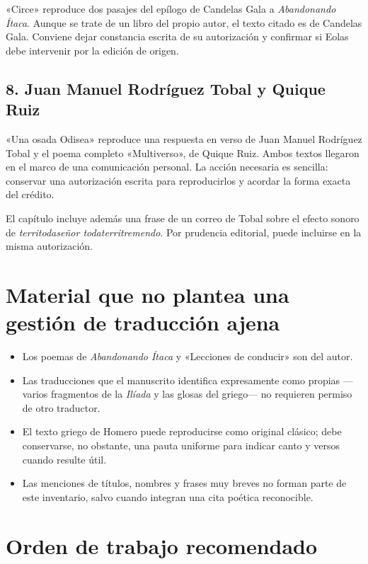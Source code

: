 \documentclass[12pt,a4paper]{article}
\begin{document}
«Circe» reproduce dos pasajes del epílogo de Candelas Gala a \emph{Abandonando Ítaca}. Aunque se trate de un libro del propio autor, el texto citado es de Candelas Gala. Conviene dejar constancia escrita de su autorización y confirmar si Eolas debe intervenir por la edición de origen.

\subsection*{8. Juan Manuel Rodríguez Tobal y Quique Ruiz}

«Una osada Odisea» reproduce una respuesta en verso de Juan Manuel Rodríguez Tobal y el poema completo «Multiverso», de Quique Ruiz. Ambos textos llegaron en el marco de una comunicación personal. La acción necesaria es sencilla: conservar una autorización escrita para reproducirlos y acordar la forma exacta del crédito.

El capítulo incluye además una frase de un correo de Tobal sobre el efecto sonoro de \emph{territodaseñor todaterritremendo}. Por prudencia editorial, puede incluirse en la misma autorización.

\section*{Material que no plantea una gestión de traducción ajena}

\begin{itemize}[leftmargin=*]
  \item Los poemas de \emph{Abandonando Ítaca} y «Lecciones de conducir» son del autor.
  \item Las traducciones que el manuscrito identifica expresamente como propias ---varios fragmentos de la \emph{Ilíada} y las glosas del griego--- no requieren permiso de otro traductor.
  \item El texto griego de Homero puede reproducirse como original clásico; debe conservarse, no obstante, una pauta uniforme para indicar canto y versos cuando resulte útil.
  \item Las menciones de títulos, nombres y frases muy breves no forman parte de este inventario, salvo cuando integran una cita poética reconocible.
\end{itemize}

\section*{Orden de trabajo recomendado}
\end{document}
